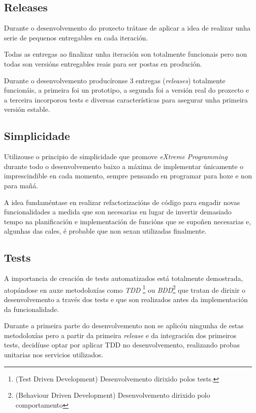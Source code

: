     \subsection{Releases}
    Durante o desenvolvemento do proxecto trátase de aplicar a idea de realizar 
unha serie de pequenos entregables en cada iteración.

    Todas as entregas ao finalizar unha iteración son totalmente funcionais 
pero non todas son versións entregables reais para ser postas en produción.

    Durante o desenvolvemento producíronse 3 entregas (\emph{releases}) 
totalmente funcionáis, a primeira foi un prototipo, a segunda foi a versión 
real do proxecto e a terceira incorporou tests e diversas características para 
asegurar unha primeira versión estable.

    \subsection{Simplicidade}
    Utilizouse o principio de simplicidade que promove \emph{eXtreme 
Programming} durante todo o desenvolvemento baixo a máxima de implementar 
únicamente o imprescindible en cada momento, sempre pensando en programar para 
hoxe e non para mañá.

    A idea fundaméntase en realizar refactorizacións de código para engadir 
novas funcionalidades a medida que son necesarias en lugar de invertir 
demasiado tempo na planificación e implementación de funcións que se supoñen 
necesarias e, algunhas das cales, é probable que non sexan utilizadas 
finalmente.

    \subsection{Tests}
    A importancia de creación de tests automatizados está totalmente 
demostrada, atopándose en auxe metodoloxías como \emph{TDD} \footnote{(Test 
Driven Development) Desenvolvemento dirixido polos tests.} ou 
\emph{BDD}\footnote{(Behaviour Driven Development) Desenvolvemento dirixido 
polo comportamento} que tratan de dirixir o desenvolvemento a través dos tests e
que son realizados antes da implementación da funcionalidade.

    Durante a primeira parte do desenvolvemento non se aplicóu ningunha de 
estas metodoloxías pero a partir da primeira \emph{release} e da integración 
dos primeiros tests, decidíuse optar por aplicar TDD no desenvolvemento, 
realizando probas unitarias nos servicios utilizados.

